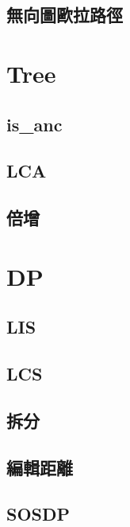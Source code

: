 \documentclass[a4paper,10pt,twocolumn,oneside]{article}
\begin{document}
    \subsection{無向圖歐拉路徑}
    

\section{Tree}

    \subsection{is\_anc}
    

    \subsection{LCA}
    

    \subsection{倍增}
    


\section{DP}
    \subsection{LIS}
    

    \subsection{LCS}
    

    \subsection{拆分}
    

    \subsection{編輯距離}
    

    \subsection{SOSDP}
    
\end{document}
